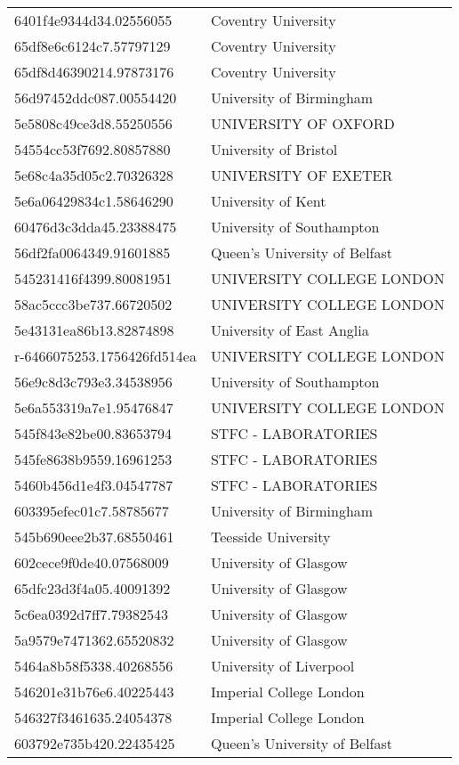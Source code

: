 \begin{tabular}{ll}
6401f4e9344d34.02556055 & Coventry University \\
65df8e6c6124c7.57797129 & Coventry University \\
65df8d46390214.97873176 & Coventry University \\
56d97452ddc087.00554420 & University of Birmingham \\
5e5808c49ce3d8.55250556 & UNIVERSITY OF OXFORD \\
54554cc53f7692.80857880 & University of Bristol \\
5e68c4a35d05c2.70326328 & UNIVERSITY OF EXETER \\
5e6a06429834c1.58646290 & University of Kent \\
60476d3c3dda45.23388475 & University of Southampton \\
56df2fa0064349.91601885 & Queen's University of Belfast \\
545231416f4399.80081951 & UNIVERSITY COLLEGE LONDON \\
58ac5ccc3be737.66720502 & UNIVERSITY COLLEGE LONDON \\
5e43131ea86b13.82874898 & University of East Anglia \\
r-6466075253.1756426fd514ea & UNIVERSITY COLLEGE LONDON \\
56e9c8d3c793e3.34538956 & University of Southampton \\
5e6a553319a7e1.95476847 & UNIVERSITY COLLEGE LONDON \\
545f843e82be00.83653794 & STFC - LABORATORIES \\
545fe8638b9559.16961253 & STFC - LABORATORIES \\
5460b456d1e4f3.04547787 & STFC - LABORATORIES \\
603395efec01c7.58785677 & University of Birmingham \\
545b690eee2b37.68550461 & Teesside University \\
602cece9f0de40.07568009 & University of Glasgow \\
65dfc23d3f4a05.40091392 & University of Glasgow \\
5c6ea0392d7ff7.79382543 & University of Glasgow \\
5a9579e7471362.65520832 & University of Glasgow \\
5464a8b58f5338.40268556 & University of Liverpool \\
546201e31b76e6.40225443 & Imperial College London \\
546327f3461635.24054378 & Imperial College London \\
603792e735b420.22435425 & Queen's University of Belfast \\

\end{tabular}
